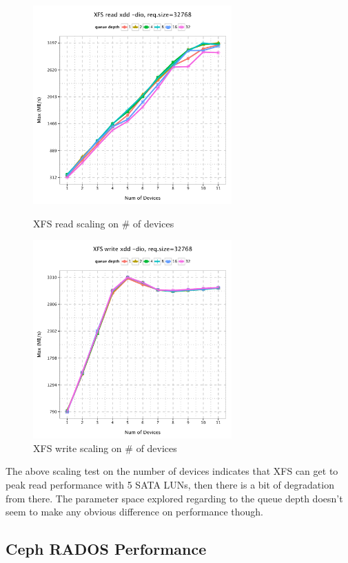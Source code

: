 \documentclass{article}
\begin{document}
\begin{figure}[htb]
\centering
\begin{minipage}[t]{0.5\linewidth}
\centering
\includegraphics[width=3in]{data/xdd-read}
\caption{XFS read scaling on \# of devices}
\end{minipage}%
\begin{minipage}[t]{0.5\linewidth}
\centering
\includegraphics[width=3in]{data/xdd-write}
\caption{XFS write scaling on \# of devices}
\end{minipage}%
\end{figure}


The above scaling test on the number of devices indicates that XFS can get to
peak read performance with 5 SATA LUNs, then there is a bit of degradation from
there. The parameter space explored regarding to the queue depth doesn't seem
to make any obvious difference on performance though.


\subsection{Ceph RADOS Performance}
\end{document}
